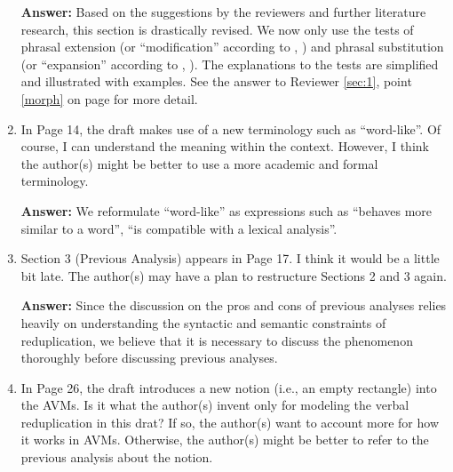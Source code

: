 \documentclass[fleqn,twoside]{article}
\begin{document}
\begin{enumerate}
\textbf{Answer:} 
Based on the suggestions by the reviewers and further literature research, this section is drastically revised.
We now only use the tests of phrasal extension (or ``modification'' according to \citealt[32]{Dai1992}, \citeyear[117]{Dai1998})
and phrasal substitution (or ``expansion'' according to \citealt[33]{Dai1992}, \citeyear[117--120]{Dai1998}).
The explanations to the tests are simplified and illustrated with examples.
See the answer to Reviewer \ref{sec:1}, point \ref{morph} on page \pageref{morph} for more detail.


\item
In Page 14, the draft makes use of a new terminology such as ``word-like''. Of course, I can understand the meaning within the context. However, I think the author(s) might be better to use a more academic and formal terminology.

\textbf{Answer:} We reformulate ``word-like'' as expressions such as ``behaves more similar to a word'', ``is compatible with a lexical analysis''.


\item
Section 3 (Previous Analysis) appears in Page 17. I think it would be a little bit late. The author(s) may have a plan to restructure Sections 2 and 3 again.

\noindent
\textbf{Answer: }Since the discussion on the pros and cons of previous analyses relies heavily on understanding the syntactic and semantic constraints of reduplication, we believe that it is necessary to discuss the phenomenon thoroughly before discussing previous analyses.

\item
In Page 26, the draft introduces a new notion (i.e., an empty rectangle) into the AVMs. Is it what
the author(s) invent only for modeling the verbal reduplication in this drat? If so, the author(s)
want to account more for how it works in AVMs. Otherwise, the author(s) might be better to refer to
the previous analysis about the notion.


\end{enumerate}
\end{document}

